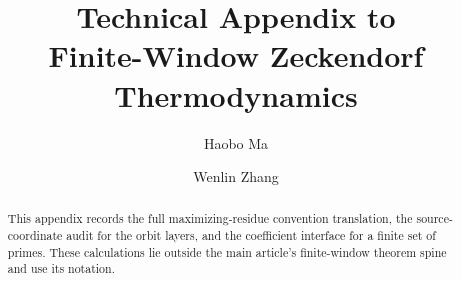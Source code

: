 \documentclass[12pt,reqno]{amsart}
\title[Appendix to finite-window thermodynamics]{Technical Appendix to\\
Finite-Window Zeckendorf Thermodynamics}
\author{Haobo Ma}
\author{Wenlin Zhang}
\date{}
\theoremstyle{plain}
\theoremstyle{remark}
\theoremstyle{definition}
\numberwithin{equation}{section}
\begin{document}
\begin{abstract}
This appendix records the full maximizing-residue convention translation,
the source-coordinate audit for the orbit layers, and the coefficient
interface for a finite set of primes.  These calculations lie outside the
main article's finite-window theorem spine and use its notation.
\end{abstract}
\maketitle



\end{document}
